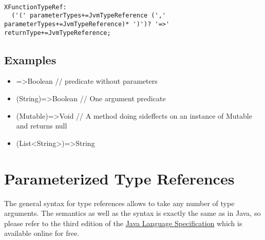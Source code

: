 \documentclass[a4paper,10pt]{scrreprt}
\newlength{\itemindentlen}
\begin{document}
\begin{lstlisting}

XFunctionTypeRef:
  ('(' parameterTypes+=JvmTypeReference (',' parameterTypes+=JvmTypeReference)* ')')? '=>' returnType+=JvmTypeReference;

\end{lstlisting}





\subsection{ Examples }


\setlength{\itemindentlen}{\textwidth}
\begin{itemize}
\addtolength{\itemindentlen}{-2em}

\item \begin{minipage}[t]{\itemindentlen}
=>Boolean // predicate without parameters
\end{minipage}

\item \begin{minipage}[t]{\itemindentlen}
(String)=>Boolean // One argument predicate
\end{minipage}

\item \begin{minipage}[t]{\itemindentlen}
(Mutable)=>Void // A method doing sideffects on an instance of Mutable and returns null
\end{minipage}

\item \begin{minipage}[t]{\itemindentlen}
(List<String>)=>String
\end{minipage}

\end{itemize}
\addtolength{\itemindentlen}{2em}







\section{Parameterized Type References}
\label{ParameterizedTypeReference}

The general syntax for type references allows to take any number of type arguments. The semantics as well as the syntax is exactly the same as in Java, so please 
refer to the third edition of the  \href{http://java.sun.com/docs/books/jls/third_edition/html/j3TOC.html}{Java Language Specification} which is available online for free.
\end{document}
